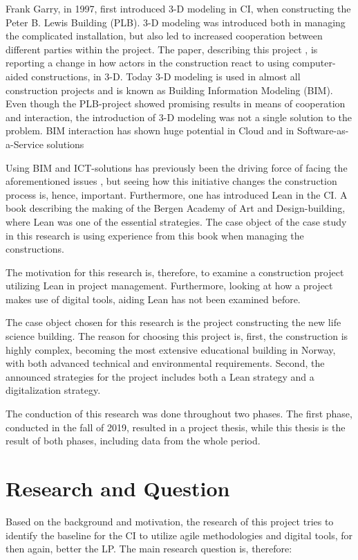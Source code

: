 Frank Garry, in 1997, first introduced 3-D modeling in CI, when constructing the Peter B. Lewis Building (PLB). 3-D modeling was introduced both in managing the complicated installation, but also led to increased cooperation between different parties within the project. The paper, describing this project \cite{frank_gehry}, is reporting a change in how actors in the construction react to using computer-aided constructions, in 3-D. Today 3-D modeling is used in almost all construction projects and is known as Building Information Modeling (BIM). Even though the PLB-project showed promising results in means of cooperation and interaction, the introduction of 3-D modeling was not a single solution to the problem. BIM interaction has shown huge potential in Cloud and in Software-as-a-Service solutions \cite{das2014bimcloud}
 
Using BIM and ICT-solutions has previously been the driving force of facing the aforementioned issues \cite{arayici2010building}, but seeing how this initiative changes the construction process is, hence, important. Furthermore, one has introduced Lean in the CI. A book \cite{lean_i_praksis} describing the making of the Bergen Academy of Art and Design-building, where Lean was one of the essential strategies. The case object of the case study in this research is using experience from this book when managing the constructions. 
 
The motivation for this research is, therefore, to examine a construction project utilizing Lean in project management. Furthermore, looking at how a project makes use of digital tools, aiding Lean has not been examined before. 
 
The case object chosen for this research is the project constructing the new life science building. The reason for choosing this project is, first, the construction is highly complex, becoming the most extensive educational building in Norway, with both advanced technical and environmental requirements. Second, the announced strategies for the project includes both a Lean strategy and a digitalization strategy. 

The conduction of this research was done throughout two phases. The first phase, conducted in the fall of 2019, resulted in a project thesis, while this thesis is the result of both phases, including data from the whole period.

\section{Research and Question} \label{sec:research}
Based on the background and motivation, the research of this project tries to identify the baseline for the CI to utilize agile methodologies and digital tools, for then again, better the LP. The main research question is, therefore:

